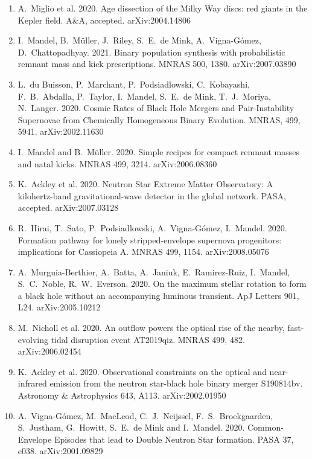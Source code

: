 \documentclass[margin,line]{res}
\begin{document}
\begin{resume}
\begin{enumerate}
\item A.~Miglio et al. 2020. Age dissection of the Milky Way discs: red giants in the Kepler field.  A\&A, accepted.  arXiv:2004.14806

\item I.~Mandel, B.~M\"{u}ller, J.~Riley, S.~E.~de Mink, A.~Vigna-G\'{o}mez, D.~Chattopadhyay. 2021.  Binary population synthesis with probabilistic remnant mass and kick prescriptions. MNRAS 500, 1380.   arXiv:2007.03890

\item L.~du Buisson, P.~Marchant, P.~Podsiadlowski, C.~Kobayashi, F.~B.~Abdalla, P.~Taylor, I.~Mandel, S.~E.~de Mink, T.~J.~Moriya, N.~Langer.  2020. Cosmic Rates of Black Hole Mergers and Pair-Instability Supernovae from Chemically Homogeneous Binary Evolution. MNRAS, 499, 5941.  arXiv:2002.11630

\item I.~Mandel and B.~M\"{u}ller. 2020. Simple recipes for compact remnant masses and natal kicks.  MNRAS 499, 3214.  arXiv:2006.08360

\item K.~Ackley et al. 2020. Neutron Star Extreme Matter Observatory: A kilohertz-band gravitational-wave detector in the global network. PASA, accepted.  arXiv:2007.03128 

\item R.~Hirai, T.~Sato, P.~Podsiadlowski, A.~Vigna-G\'{o}mez, I.~Mandel. 2020. Formation pathway for lonely stripped-envelope supernova progenitors: implications for Cassiopeia A.  MNRAS 499, 1154. arXiv:2008.05076

\item A.~Murguia-Berthier, A.~Batta, A.~Janiuk, E.~Ramirez-Ruiz, I.~Mandel, S.~C.~Noble, R.~W.~Everson.  2020.  On the maximum stellar rotation to form a black hole without an accompanying luminous transient.  ApJ Letters 901, L24.  arXiv:2005.10212

\item M.~Nicholl et al. 2020. An outflow powers the optical rise of the nearby, fast-evolving tidal disruption event AT2019qiz. MNRAS 499, 482.  arXiv:2006.02454

\item K.~Ackley et al. 2020. Observational constraints on the optical and near-infrared emission from the neutron star-black hole binary merger S190814bv.  Astronomy \& Astrophysics 643, A113.
arXiv:2002.01950

\item A.~Vigna-G\'{o}mez, M.~MacLeod, C.~J.~Neijssel, F.~S.~Broekgaarden, S.~Justham, G.~Howitt, S.~E.~de Mink and I.~Mandel.  2020. Common-Envelope Episodes that lead to Double Neutron Star formation.  PASA 37, e038.  arXiv:2001.09829 


\end{enumerate}
\end{resume}
\end{document}
